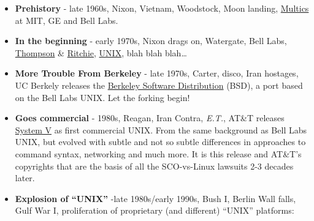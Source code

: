 \documentclass[10pt,]{book}
\numberwithin{figure}{chapter}
\begin{document}
\begin{itemize}
\item
  \textbf{Prehistory} - late 1960s, Nixon, Vietnam, Woodstock, Moon
  landing, \href{https://en.wikipedia.org/wiki/Multics}{Multics} at MIT,
  GE and Bell Labs.
\item
  \textbf{In the beginning} - early 1970s, Nixon drags on, Watergate,
  Bell Labs, \href{https://en.wikipedia.org/wiki/Ken_Thompson}{Thompson}
  \& \href{https://en.wikipedia.org/wiki/Dennis_Ritchie}{Ritchie},
  \href{https://en.wikipedia.org/wiki/History_of_Unix}{UNIX},
   blah blah blah\ldots{}
\item
  \textbf{More Trouble From Berkeley} - late 1970s, Carter, disco, Iran
  hostages, UC Berkely releases the
  \href{https://en.wikipedia.org/wiki/Berkeley_Software_Distribution}{Berkeley
  Software Distribution} (BSD),  a port based on the Bell
  Labs UNIX. Let the forking begin!
\item
  \textbf{Goes commercial} - 1980s, Reagan, Iran Contra, \emph{E.T.},
  AT\&T releases
  \href{https://en.wikipedia.org/wiki/UNIX_System_V}{System V}
   as first commercial UNIX. From the same background as
  Bell Labs UNIX, but evolved with subtle and not so subtle differences
  in approaches to command syntax, networking and much more. It is this
  release and AT\&T's copyrights that are the basis of all the
  SCO-vs-Linux lawsuits 2-3 decades later.
\item
  \textbf{Explosion of ``UNIX''} -late 1980s/early 1990s, Bush I, Berlin
  Wall falls, Gulf War I, proliferation of proprietary (and different)
  ``UNIX'' platforms:


\end{itemize}
\end{document}
